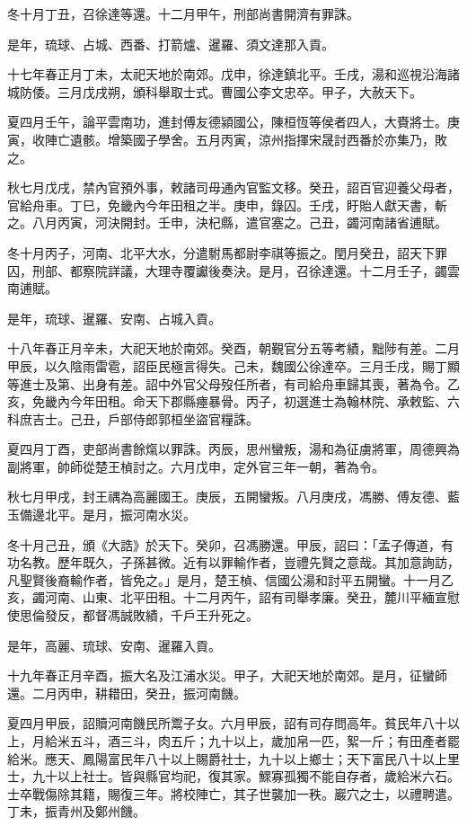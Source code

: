 \begin{pinyinscope}
冬十月丁丑，召徐達等還。十二月甲午，刑部尚書開濟有罪誅。

是年，琉球、占城、西番、打箭爐、暹羅、須文達那入貢。

十七年春正月丁未，太祀天地於南郊。戊申，徐達鎮北平。壬戌，湯和巡視沿海諸城防倭。三月戊戌朔，頒科舉取士式。曹國公李文忠卒。甲子，大赦天下。

夏四月壬午，論平雲南功，進封傅友德潁國公，陳桓恆等侯者四人，大賚將士。庚寅，收陣亡遺骸。增築國子學舍。五月丙寅，涼州指揮宋晟討西番於亦集乃，敗之。

秋七月戊戌，禁內官預外事，敕諸司毋通內官監文移。癸丑，詔百官迎養父母者，官給舟車。丁巳，免畿內今年田租之半。庚申，錄囚。壬戌，盱貽人獻天書，斬之。八月丙寅，河決開封。壬申，決杞縣，遣官塞之。己丑，蠲河南諸省逋賦。

冬十月丙子，河南、北平大水，分遣駙馬都尉李祺等振之。閏月癸丑，詔天下罪囚，刑部、都察院詳議，大理寺覆讞後奏決。是月，召徐達還。十二月壬子，蠲雲南逋賦。

是年，琉球、暹羅、安南、占城入貢。

十八年春正月辛未，大祀天地於南郊。癸酉，朝覲官分五等考績，黜陟有差。二月甲辰，以久陰雨雷雹，詔臣民極言得失。己未，魏國公徐達卒。三月壬戌，賜丁顯等進士及第、出身有差。詔中外官父母歿任所者，有司給舟車歸其喪，著為令。乙亥，免畿內今年田租。命天下郡縣瘞暴骨。丙子，初選進士為翰林院、承敕監、六科庶吉士。己丑，戶部侍郎郭桓坐盜官糧誅。

夏四月丁酉，吏部尚書餘熂以罪誅。丙辰，思州蠻叛，湯和為征虜將軍，周德興為副將軍，帥師從楚王楨討之。六月戊申，定外官三年一朝，著為令。

秋七月甲戌，封王禑為高麗國王。庚辰，五開蠻叛。八月庚戌，馮勝、傅友德、藍玉備邊北平。是月，振河南水災。

冬十月己丑，頒《大誥》於天下。癸卯，召馮勝還。甲辰，詔曰：「孟子傳道，有功名教。歷年既久，子孫甚微。近有以罪輸作者，豈禮先賢之意哉。其加意詢訪，凡聖賢後裔輸作者，皆免之。」是月，楚王楨、信國公湯和討平五開蠻。十一月乙亥，蠲河南、山東、北平田租。十二月丙午，詔有司舉孝廉。癸丑，麓川平緬宣慰使思倫發反，都督馮誠敗績，千戶王升死之。

是年，高麗、琉球、安南、暹羅入貢。

十九年春正月辛酉，振大名及江浦水災。甲子，大祀天地於南郊。是月，征蠻師還。二月丙申，耕耤田，癸丑，振河南饑。

夏四月甲辰，詔贖河南饑民所鬻子女。六月甲辰，詔有司存問高年。貧民年八十以上，月給米五斗，酒三斗，肉五斤；九十以上，歲加帛一匹，絮一斤；有田產者罷給米。應天、鳳陽富民年八十以上賜爵社士，九十以上鄉士；天下富民八十以上里士，九十以上社士。皆與縣官均祀，復其家。鰥寡孤獨不能自存者，歲給米六石。士卒戰傷除其籍，賜復三年。將校陣亡，其子世襲加一秩。巖穴之士，以禮聘遣。丁未，振青州及鄭州饑。


\end{pinyinscope}
